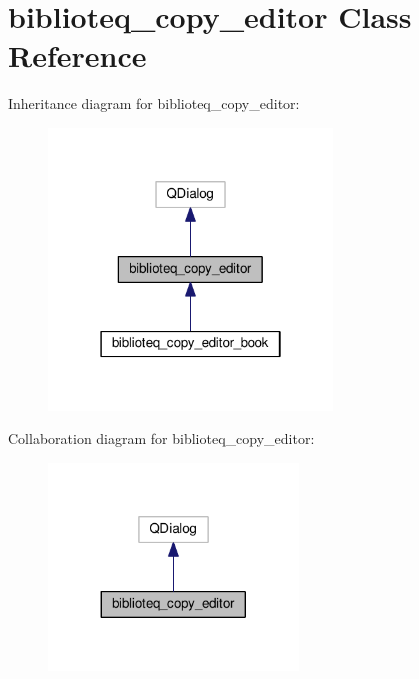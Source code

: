 \hypertarget{classbiblioteq__copy__editor}{}\section{biblioteq\+\_\+copy\+\_\+editor Class Reference}
\label{classbiblioteq__copy__editor}


Inheritance diagram for biblioteq\+\_\+copy\+\_\+editor\+:
\nopagebreak
\begin{figure}[H]
\begin{center}
\leavevmode
\includegraphics[width=214pt]{classbiblioteq__copy__editor__inherit__graph}
\end{center}
\end{figure}


Collaboration diagram for biblioteq\+\_\+copy\+\_\+editor\+:
\nopagebreak
\begin{figure}[H]
\begin{center}
\leavevmode
\includegraphics[width=188pt]{classbiblioteq__copy__editor__coll__graph}
\end{center}
\end{figure}
